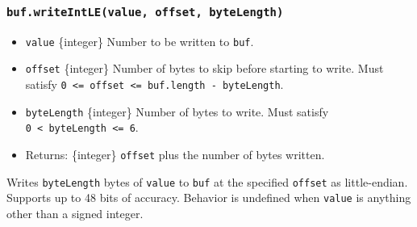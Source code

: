 \subsubsection{\texorpdfstring{\texttt{buf.writeIntLE(value,\ offset,\ byteLength)}}{buf.writeIntLE(value, offset, byteLength)}}\label{buf.writeintlevalue-offset-bytelength}

\begin{itemize}
\tightlist
\item
  \texttt{value} \{integer\} Number to be written to \texttt{buf}.
\item
  \texttt{offset} \{integer\} Number of bytes to skip before starting to
  write. Must satisfy
  \texttt{0\ \textless{}=\ offset\ \textless{}=\ buf.length\ -\ byteLength}.
\item
  \texttt{byteLength} \{integer\} Number of bytes to write. Must satisfy
  \texttt{0\ \textless{}\ byteLength\ \textless{}=\ 6}.
\item
  Returns: \{integer\} \texttt{offset} plus the number of bytes written.
\end{itemize}

Writes \texttt{byteLength} bytes of \texttt{value} to \texttt{buf} at
the specified \texttt{offset} as little-endian. Supports up to 48 bits
of accuracy. Behavior is undefined when \texttt{value} is anything other
than a signed integer.

\begin{Shaded}
\begin{Highlighting}[]
\NormalTok{ \{ }\NormalTok{ \} } \OperatorTok{;}

\OperatorTok{=} \NormalTok{(}\NormalTok{)}\OperatorTok{;}

\NormalTok{(}\OperatorTok{,} \OperatorTok{,} \NormalTok{)}\OperatorTok{;}

\OperatorTok{;}
\end{Highlighting}
\end{Shaded}

